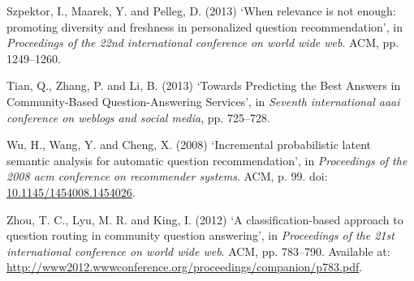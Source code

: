 \documentclass[11pt,preprint, authoryear]{article}
\numberwithin{equation}{section}
\begin{document}
\hypertarget{ref-Szpektor2013}{}
Szpektor, I., Maarek, Y. and Pelleg, D. (2013) `When relevance is not
enough: promoting diversity and freshness in personalized question
recommendation', in \emph{Proceedings of the 22nd international
conference on world wide web}. ACM, pp. 1249--1260.

\hypertarget{ref-Tian2013}{}
Tian, Q., Zhang, P. and Li, B. (2013) `Towards Predicting the Best
Answers in Community-Based Question-Answering Services', in
\emph{Seventh international aaai conference on weblogs and social
media}, pp. 725--728.

\hypertarget{ref-Wu2008}{}
Wu, H., Wang, Y. and Cheng, X. (2008) `Incremental probabilistic latent
semantic analysis for automatic question recommendation', in
\emph{Proceedings of the 2008 acm conference on recommender systems}.
ACM, p. 99. doi:
\href{https://doi.org/10.1145/1454008.1454026}{10.1145/1454008.1454026}.

\hypertarget{ref-Zhou2012}{}
Zhou, T. C., Lyu, M. R. and King, I. (2012) `A classification-based
approach to question routing in community question answering', in
\emph{Proceedings of the 21st international conference on world wide
web}. ACM, pp. 783--790. Available at:
\url{http://www2012.wwwconference.org/proceedings/companion/p783.pdf}.

\newcommand\wordcount{
    \immediate\write18{texcount -sub=section \jobname.tex  | grep "Section" |     sed -e 's/+.*//' | sed -n \thesection p > 'count.txt'}
(words)}
\end{document}
